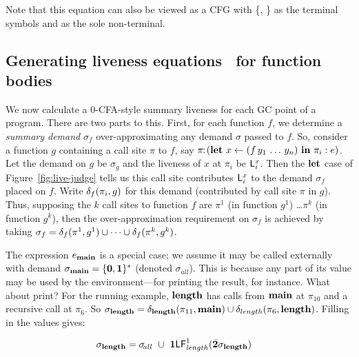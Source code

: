 \documentclass[9pt]{sigplanconf}
\newcommand{\comment}[1]{{\color{Myblue}{(#1)}}}
\begin{document}
Note that this equation can also be viewed as a CFG with \{\acdr,
\cbar\} as the terminal symbols and  as the sole non-terminal.

\subsection{Generating liveness equations \Lv\  for function bodies}
\label{sec:bodylivenessbodies}

We now calculate a 0-CFA-style summary liveness for each GC point of a
program.  There are two parts  to this.  First, for each function $f$,
we determine a {\em  summary demand} $\sigma_f$ over-approximating any
demand $\sigma$ passed to $f$.  So, consider a function $g$ containing
a  call   site  $\pi$   to  $f$,  say   $\pi\!\!:\!(\mbox{$\mathbf{ let}$}~x  \leftarrow
(f\,y_1\,\ldots\,y_n)~\mbox{$\mathbf{ in}$}~\pi_i:e)$.   Let   the  demand  on   $g$  be
$\sigma_g$ and the  liveness of $x$ at $\pi_i$  be $\mathsf{L}_{{i}}^{x}$. Then
the $\mbox{$\mathbf{ let}$}$ case of Figure~\ref{fig:live-judge} tells us this call site
contributes  $\mathsf{L}_{{i}}^{x}$ to  the  demand $\sigma_f$  placed on  $f$.
Write $\delta_{f}({\pi_i},{g})$  for this demand  (contributed by call
site $\pi$  in $g$).  Thus, supposing  the $k$ call  sites to function
$f$  are  $\pi^1$ (in  function  $g^1$)  \ldots  $\pi^k$ (in  function
$g^k$),  then  the  over-approximation  requirement on  $\sigma_f$  is
achieved by  taking $\sigma_f =  \delta_{f}({\pi^1},{g^1}) \cup \cdots
\cup \delta_{f}({\pi^k},{g^k})$\comment{Rewrite, copied from earlier paper}.


The expression $e_{\mathbf{main}}$  is a special case; we  assume it may be
called externally with demand $\sigma_{\mathbf{main}} = \{\mathbf{0},\mathbf{1}\}^\ast$
(denoted $\sigma_{\!all}$).  This is because any part of its value may
be used by the environment---for printing the result, for instance.
{\color {red} What about print?}
For the running example, $\mathbf{length}$ has calls from $\mathbf{main}$ at $\pi_{10}$
and a recursive call at $\pi_6$.
So $\sigma_{\mathbf{length}} =
     \delta_{\mathbf{length}}({\pi_{11}},{\mathbf{main}})  \cup \delta_{length}({\pi_6},{\mathbf{length}})$.
Filling in  the values gives:

\begin{align*}
\sigma_{\mathbf{length}}    &=
 \sigma_{\!all}  ~\cup~ \mathbf{1}\mathsf{LF}_{\mathit length}^{1}( {\mathit {\bar{\mathbf{2}}}\sigma_{\mathit{\mathbf{length}}}})
\end{align*}
\end{document}
